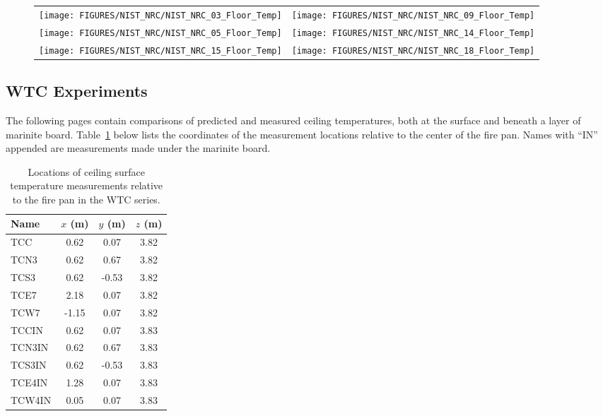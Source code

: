 \begin{figure}[p]
\begin{tabular*}{\textwidth}{l@{\extracolsep{\fill}}r}
\texttt{[image: FIGURES/NIST\_NRC/NIST\_NRC\_03\_Floor\_Temp]} &
\texttt{[image: FIGURES/NIST\_NRC/NIST\_NRC\_09\_Floor\_Temp]} \\
\texttt{[image: FIGURES/NIST\_NRC/NIST\_NRC\_05\_Floor\_Temp]} &
\texttt{[image: FIGURES/NIST\_NRC/NIST\_NRC\_14\_Floor\_Temp]} \\
\texttt{[image: FIGURES/NIST\_NRC/NIST\_NRC\_15\_Floor\_Temp]} &
\texttt{[image: FIGURES/NIST\_NRC/NIST\_NRC\_18\_Floor\_Temp]}
\end{tabular*}
\label{NIST_NRC_Floor_Temp_Open}
\end{figure}

\clearpage


\subsection{WTC Experiments}

The following pages contain comparisons of predicted and measured ceiling temperatures, both at the surface and beneath a layer of marinite board. Table~\ref{WTC_Ceiling} below lists the coordinates of the measurement locations relative to the center of the fire pan. Names with ``IN'' appended are measurements made under the marinite board.


\begin{table}[h!]
\caption[Ceiling surface measurement locations for the WTC series]{Locations of ceiling surface temperature measurements relative to the fire pan in the WTC series.}
\begin{center}
\begin{tabular}{|l|c|c|c|}
\hline
Name                & $x$ (m)   & $y$ (m)   & $z$ (m)   \\ \hline \hline
TCC                 & 0.62      & 0.07      & 3.82      \\ \hline
TCN3                & 0.62      & 0.67      & 3.82      \\ \hline
TCS3                & 0.62      & -0.53     & 3.82      \\ \hline
TCE7                & 2.18      & 0.07      & 3.82      \\ \hline
TCW7                & -1.15     & 0.07      & 3.82      \\ \hline \hline
TCCIN               & 0.62      & 0.07      & 3.83      \\ \hline
TCN3IN              & 0.62      & 0.67      & 3.83      \\ \hline
TCS3IN              & 0.62      & -0.53     & 3.83      \\ \hline
TCE4IN              & 1.28      & 0.07      & 3.83      \\ \hline
TCW4IN              & 0.05      & 0.07      & 3.83      \\ \hline
\end{tabular}
\end{center}
\label{WTC_Ceiling}
\end{table}

